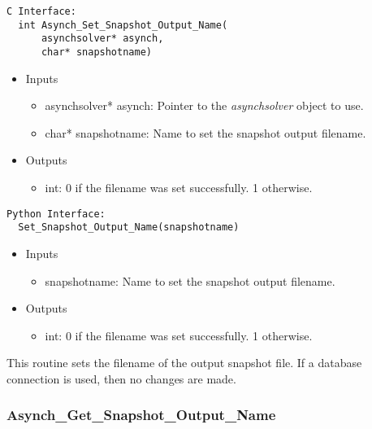 \documentclass[12pt]{article}
\begin{document}
\begin{lstlisting}[style=CStyle]
  C Interface:
  int Asynch_Set_Snapshot_Output_Name(
      asynchsolver* asynch,
      char* snapshotname)
\end{lstlisting}
\begin{itemize}
 \item Inputs
  \begin{itemize}
   \item asynchsolver* asynch: Pointer to the \emph{asynchsolver} object to use.
   \item char* snapshotname: Name to set the snapshot output filename.
  \end{itemize}
 \item Outputs
  \begin{itemize}
   \item int: 0 if the filename was set successfully. 1 otherwise.
  \end{itemize}
\end{itemize}
\begin{lstlisting}[style=PythonStyle]
  Python Interface:
  Set_Snapshot_Output_Name(snapshotname)
\end{lstlisting}
\begin{itemize}
 \item Inputs
  \begin{itemize}
   \item snapshotname: Name to set the snapshot output filename.
  \end{itemize}
 \item Outputs
  \begin{itemize}
   \item int: 0 if the filename was set successfully. 1 otherwise.
  \end{itemize}
\end{itemize}
This routine sets the filename of the output snapshot file. If a database connection is used, then no changes are made.


\subsubsection{Asynch\_Get\_Snapshot\_Output\_Name} \label{sec: asynch_get_snapshot_output_name}
\end{document}
